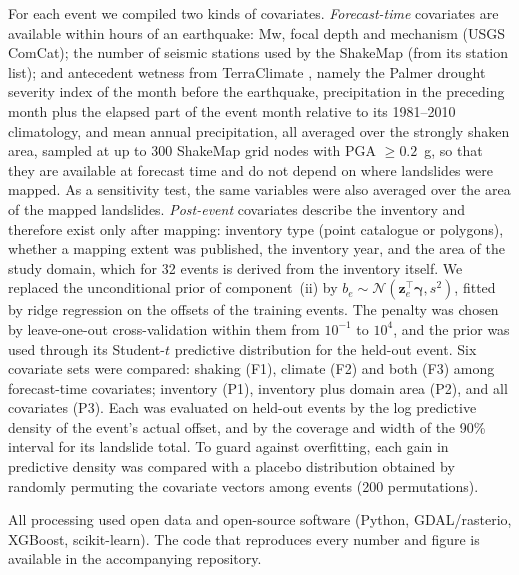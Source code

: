 For each event we compiled two kinds of covariates. \emph{Forecast-time} covariates are available within hours of an earthquake: Mw, focal depth and mechanism (USGS ComCat); the number of seismic stations used by the ShakeMap (from its station list); and antecedent wetness from TerraClimate \citep{abatzoglou2018}, namely the Palmer drought severity index of the month before the earthquake, precipitation in the preceding month plus the elapsed part of the event month relative to its 1981--2010 climatology, and mean annual precipitation, all averaged over the strongly shaken area, sampled at up to 300 ShakeMap grid nodes with PGA $\ge 0.2$~g, so that they are available at forecast time and do not depend on where landslides were mapped. As a sensitivity test, the same variables were also averaged over the area of the mapped landslides. \emph{Post-event} covariates describe the inventory and therefore exist only after mapping: inventory type (point catalogue or polygons), whether a mapping extent was published, the inventory year, and the area of the study domain, which for 32 events is derived from the inventory itself. We replaced the unconditional prior of component~(ii) by $b_e\sim\mathcal{N}(\mathbf{z}_e^\top\boldsymbol{\gamma},s^2)$, fitted by ridge regression on the offsets of the training events. The penalty was chosen by leave-one-out cross-validation within them from $10^{-1}$ to $10^{4}$, and the prior was used through its Student-$t$ predictive distribution for the held-out event. Six covariate sets were compared: shaking (F1), climate (F2) and both (F3) among forecast-time covariates; inventory (P1), inventory plus domain area (P2), and all covariates (P3). Each was evaluated on held-out events by the log predictive density of the event's actual offset, and by the coverage and width of the 90\% interval for its landslide total. To guard against overfitting, each gain in predictive density was compared with a placebo distribution obtained by randomly permuting the covariate vectors among events (200 permutations).

All processing used open data and open-source software (Python, GDAL/rasterio, XGBoost, scikit-learn). The code that reproduces every number and figure is available in the accompanying repository.
